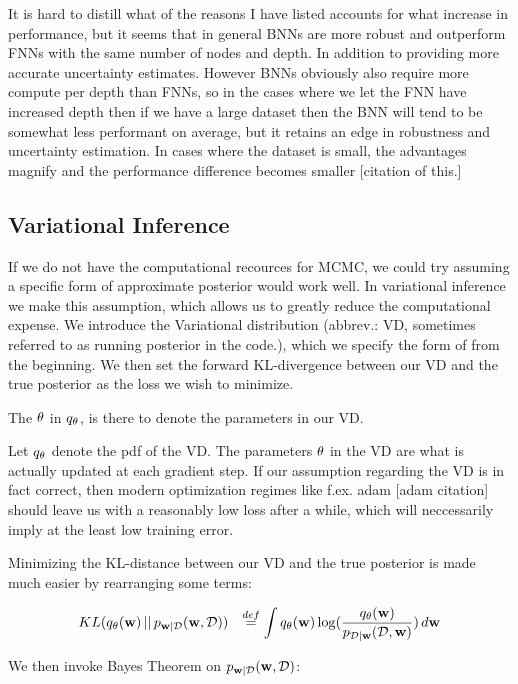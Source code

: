 \documentclass[nofootinbib,UKenglish,nobalancelastpage,12pt]{article}
\newcommand{\vect}{\ensuremath{\mathbf}}
\begin{document}
It is hard to distill what of the reasons I have listed accounts for what increase in performance, but it seems that in general BNNs are more robust and outperform FNNs with the same number of nodes and depth. In addition to providing more accurate uncertainty estimates. However BNNs obviously also require more compute per depth than FNNs, so in the cases where we let the FNN have increased depth then if we have a large dataset then the BNN will tend to be somewhat less performant on average, but it retains an edge in robustness and uncertainty estimation. In cases where the dataset is small, the advantages magnify and the performance difference becomes smaller [citation of this.]
\clearpage
\subsection{Variational Inference}
If we do not have the computational recources for MCMC, we could try assuming a specific form of approximate posterior would work well. In variational inference we make this assumption, which allows us to greatly reduce the computational expense. We introduce the Variational distribution (abbrev.: VD, sometimes referred to as running posterior in the code.), which we specify the form of from the beginning. We then set the forward KL-divergence between our VD and the true posterior as the loss we wish to minimize.

The $\vect{\theta}$ in $q_{\vect{\theta}}$, is there to denote the parameters in our VD.

Let $q_{\vect{\theta}}$ denote the pdf of the VD. The parameters $\vect{\theta}$ in the VD are what is actually updated at each gradient step. If our assumption regarding the VD is in fact correct, then modern optimization regimes like f.ex. adam [adam citation] should leave us with a reasonably low loss after a while, which will neccessarily imply at the least low training error.

Minimizing the KL-distance between our VD and the true posterior is made much easier by rearranging some terms:

$$
\begin{aligned}
& K L(q_{\vect{\theta}}(\vect{w}) \, || \, p_{\vect{w}|\mathcal{D}}(\vect{w},\mathcal{D}))
& \stackrel{def}{=}\int q_{\vect{\theta}}(\vect{w}) \log (\frac{q_{\vect{\theta}}(\vect{w})}{p_{\mathcal{D}|\vect{w}}(\mathcal{D},\vect{w})}) \,d \vect{w}
\end{aligned}
$$

We then invoke Bayes Theorem on $p_{\vect{w}|\mathcal{D}}(\vect{w}, \mathcal{D})$:
\end{document}
